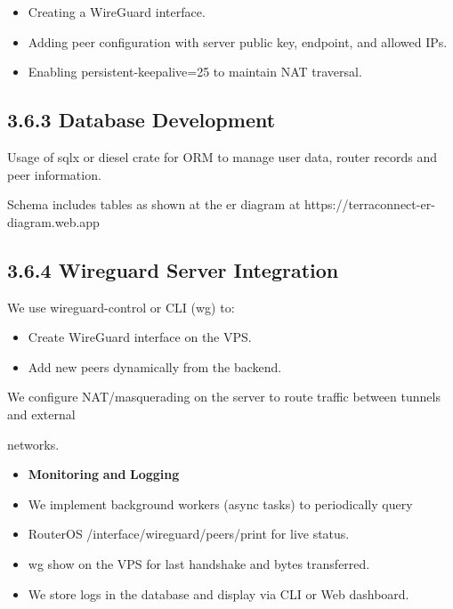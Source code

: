 \documentclass[12pt,a4paper,oneside]{report}
\begin{document}
\begin{itemize}
  \item Creating a WireGuard interface.
  \item Adding peer configuration with server public key, endpoint, and allowed IPs.
  \item Enabling persistent-keepalive=25 to maintain NAT traversal.
\end{itemize}



\subsection{3.6.3 Database Development}

Usage of sqlx or diesel crate for ORM to manage user data, router records and peer information.


Schema includes tables as shown at the er diagram at https://terraconnect-er-diagram.web.app




\subsection{3.6.4 Wireguard Server Integration}

We use wireguard-control or CLI (wg) to:


\begin{itemize}
  \item Create WireGuard interface on the VPS.
  \item Add new peers dynamically from the backend.
\end{itemize}

We configure NAT/masquerading on the server to route traffic between tunnels and external


networks.


\begin{itemize}
  \item \textbf{M}\textbf{on}\textbf{i}\textbf{t}\textbf{o}\textbf{r}\textbf{ing }\textbf{a}\textbf{nd}\textbf{ L}\textbf{o}\textbf{g}\textbf{g}\textbf{i}\textbf{n}\textbf{g}
  \item We implement background workers (async tasks) to periodically query
  \item RouterOS /interface/wireguard/peers/print for live status. 
  \item wg show on the VPS for last handshake and bytes transferred.
  \item We store logs in the database and display via CLI or Web dashboard.
\end{itemize}
\end{document}
